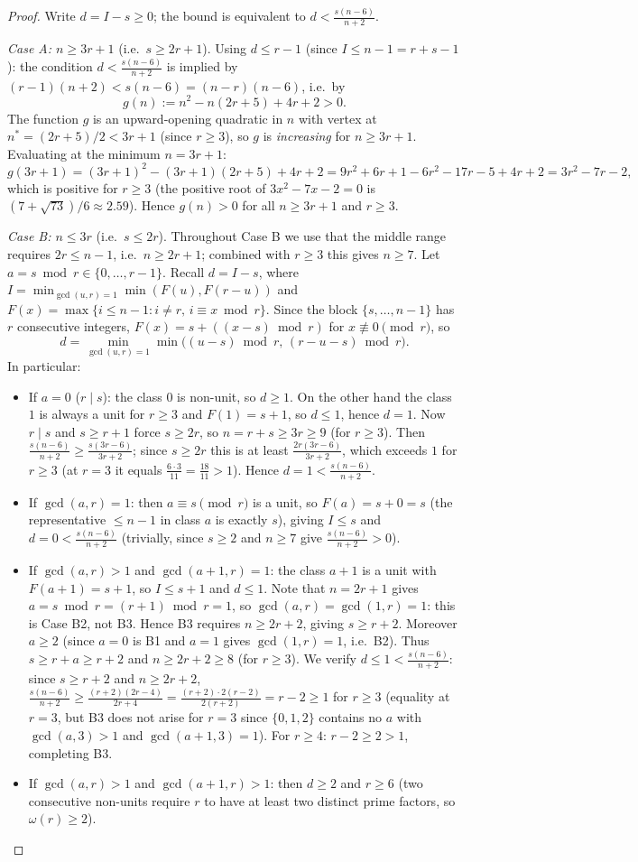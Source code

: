 \documentclass[11pt]{article}
\theoremstyle{definition}
\begin{document}
\begin{proof}
Write $d=I-s\ge0$; the bound is equivalent to $d<\frac{s(n-6)}{n+2}$.

\emph{Case A: $n\ge3r+1$} (i.e.\ $s\ge2r+1$). Using $d\le r-1$ (since
$I\le n-1=r+s-1$): the condition $d<\frac{s(n-6)}{n+2}$ is implied by
$(r-1)(n+2)<s(n-6)=(n-r)(n-6)$, i.e.\ by
\[
g(n):=n^2-n(2r+5)+4r+2>0.
\]
The function $g$ is an upward-opening quadratic in $n$ with vertex at
$n^*=(2r+5)/2<3r+1$ (since $r\ge3$), so $g$ is \emph{increasing} for
$n\ge3r+1$. Evaluating at the minimum $n=3r+1$:
\[
g(3r+1)=(3r+1)^2-(3r+1)(2r+5)+4r+2
=9r^2+6r+1-6r^2-17r-5+4r+2
=3r^2-7r-2,
\]
which is positive for $r\ge3$ (the positive root of $3x^2-7x-2=0$ is
$(7+\sqrt{73})/6\approx2.59$). Hence $g(n)>0$ for all $n\ge3r+1$ and $r\ge3$.

\emph{Case B: $n\le3r$} (i.e.\ $s\le2r$). Throughout Case B we use that the
middle range requires $2r\le n-1$, i.e.\ $n\ge2r+1$; combined with $r\ge3$
this gives $n\ge7$. Let $a=s\bmod r\in\{0,\ldots,r-1\}$.
Recall $d=I-s$, where $I=\min_{\gcd(u,r)=1}\min(F(u),F(r-u))$ and
$F(x)=\max\{i\le n-1:i\ne r,\,i\equiv x\bmod r\}$. Since the block
$\{s,\ldots,n-1\}$ has $r$ consecutive integers, $F(x)=s+((x-s)\bmod r)$
for $x\not\equiv0\pmod r$, so
\[
d=\min_{\gcd(u,r)=1}\min\bigl((u-s)\bmod r,\,(r-u-s)\bmod r\bigr).
\]
In particular:
\begin{itemize}
\item[\emph{B1}] If $a=0$ ($r\mid s$): the class $0$ is non-unit, so
  $d\ge1$. On the other hand the class $1$ is always a unit for $r\ge3$
  and $F(1)=s+1$, so $d\le1$, hence $d=1$. Now $r\mid s$ and $s\ge r+1$
  force $s\ge2r$, so $n=r+s\ge3r\ge9$ (for $r\ge3$). Then
  $\frac{s(n-6)}{n+2}\ge\frac{s(3r-6)}{3r+2}$; since $s\ge2r$ this is at
  least $\frac{2r(3r-6)}{3r+2}$, which exceeds $1$ for $r\ge3$ (at $r=3$
  it equals $\frac{6\cdot3}{11}=\frac{18}{11}>1$). Hence
  $d=1<\frac{s(n-6)}{n+2}$.
\item[\emph{B2}] If $\gcd(a,r)=1$: then $a\equiv s\pmod r$ is a unit, so
  $F(a)=s+0=s$ (the representative $\le n-1$ in class $a$ is exactly $s$),
  giving $I\le s$ and $d=0<\frac{s(n-6)}{n+2}$ (trivially, since $s\ge2$
  and $n\ge7$ give $\frac{s(n-6)}{n+2}>0$).
\item[\emph{B3}] If $\gcd(a,r)>1$ and $\gcd(a+1,r)=1$: the class $a+1$
  is a unit with $F(a+1)=s+1$, so $I\le s+1$ and $d\le1$. Note that
  $n=2r+1$ gives $a=s\bmod r=(r+1)\bmod r=1$, so $\gcd(a,r)=\gcd(1,r)=1$:
  this is Case B2, not B3. Hence B3 requires $n\ge2r+2$, giving
  $s\ge r+2$. Moreover $a\ge2$ (since $a=0$ is B1 and $a=1$ gives
  $\gcd(1,r)=1$, i.e.\ B2). Thus $s\ge r+a\ge r+2$ and
  $n\ge2r+2\ge8$ (for $r\ge3$). We verify $d\le1<
  \frac{s(n-6)}{n+2}$: since $s\ge r+2$ and $n\ge2r+2$,
  $\frac{s(n-6)}{n+2}\ge\frac{(r+2)(2r-4)}{2r+4}=\frac{(r+2)\cdot2(r-2)}{2(r+2)}
  =r-2\ge1$ for $r\ge3$ (equality at $r=3$, but B3 does not arise for
  $r=3$ since $\{0,1,2\}$ contains no $a$ with $\gcd(a,3)>1$ and
  $\gcd(a+1,3)=1$). For $r\ge4$: $r-2\ge2>1$, completing B3.
\item[\emph{B4}] If $\gcd(a,r)>1$ and $\gcd(a+1,r)>1$: then $d\ge2$
  and $r\ge6$ (two consecutive non-units require $r$ to have at least
  two distinct prime factors, so $\omega(r)\ge2$).


\end{itemize}
\end{proof}
\end{document}
